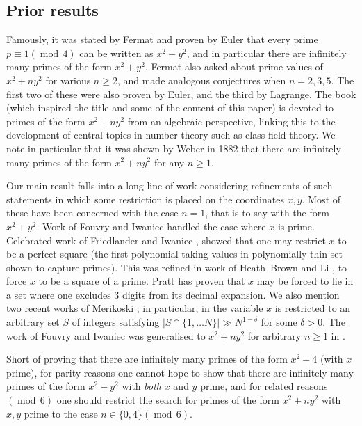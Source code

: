\documentclass[11pt,reqno]{amsart}
\numberwithin{equation}{section}
\theoremstyle{definition}
\theoremstyle{remark}
\renewcommand{\ge}{\geqslant}
\newcommand{\md}[1]{\ensuremath{(\operatorname{mod}\, #1)}}
\begin{document}
 
\subsection{Prior results}

Famously, it was stated by Fermat and proven by Euler that every prime $p \equiv 1 \md{4}$ can be written as $x^2 + y^2$, and in particular there are infinitely many primes of the form $x^2 + y^2$. Fermat also asked about prime values of $x^2 + ny^2$ for various $n \ge 2$, and made analogous conjectures when $n = 2,3,5$. The first two of these were also proven by Euler, and the third by Lagrange. The book \cite{cox-book} (which inspired the title and some of the content of this paper) is devoted to primes of the form $x^2 + ny^2$ from an algebraic perspective, linking this to the development of central topics in number theory such as class field theory. We note in particular that it was shown by Weber in 1882 \cite{weber} that there are infinitely many primes of the form $x^2 + ny^2$ for any $n \ge 1$.

Our main result falls into a long line of work considering refinements of such statements in which some restriction is placed on the coordinates $x,y$. Most of these have been concerned with the case $n = 1$, that is to say with the form $x^2 + y^2$. Work of Fouvry and Iwaniec \cite{FI97} handled the case where $x$ is prime. Celebrated work of Friedlander and Iwaniec \cite{FriIw1,FriIw2}, showed that one may restrict $x$ to be a perfect square (the first polynomial taking values in polynomially thin set shown to capture primes). This was refined in work of Heath--Brown and Li \cite{HL17}, to force $x$ to be a square of a prime. Pratt \cite{Pra20} has proven that $x$ may be forced to lie in a set where one excludes $3$ digits from its decimal expansion. We also mention two recent works of Merikoski \cite{mer1, mer2}; in particular, in \cite{mer2} the variable $x$ is restricted to an arbitrary set $S$ of integers satisfying $|S \cap \{1,\dots N\}| \gg N^{1 - \delta}$ for some $\delta > 0$. The work of Fouvry and Iwaniec was generalised to $x^2 + ny^2$ for arbitrary $n \ge 1$ in \cite{he-thesis}.

Short of proving that there are infinitely many primes of the form $x^2 + 4$ (with $x$ prime), for parity reasons one cannot hope to show that there are infinitely many primes of the form $x^2 + y^2$ with \emph{both} $x$ and $y$ prime, and for related reasons $\md 6$ one should restrict the search for primes of the form $x^2 + ny^2$ with $x, y$ prime to the case $n \in \{0,4\} \md{6}$.
\end{document}
